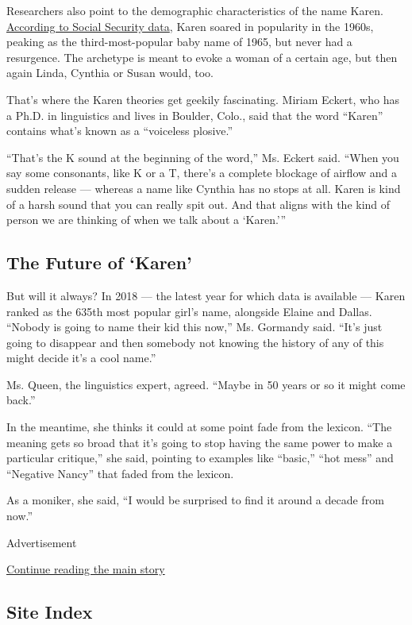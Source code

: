 Researchers also point to the demographic characteristics of the name
Karen. \href{https://www.ssa.gov/OACT/babynames/index.html}{According to
Social Security data}, Karen soared in popularity in the 1960s, peaking
as the third-most-popular baby name of 1965, but never had a resurgence.
The archetype is meant to evoke a woman of a certain age, but then again
Linda, Cynthia or Susan would, too.

That's where the Karen theories get geekily fascinating. Miriam Eckert,
who has a Ph.D. in linguistics and lives in Boulder, Colo., said that
the word ``Karen'' contains what's known as a ``voiceless plosive.''

``That's the K sound at the beginning of the word,'' Ms. Eckert said.
``When you say some consonants, like K or a T, there's a complete
blockage of airflow and a sudden release --- whereas a name like Cynthia
has no stops at all. Karen is kind of a harsh sound that you can really
spit out. And that aligns with the kind of person we are thinking of
when we talk about a `Karen.'''

\hypertarget{the-future-of-karen}{%
\subsection{The Future of `Karen'}\label{the-future-of-karen}}

But will it always? In 2018 --- the latest year for which data is
available --- Karen ranked as the 635th most popular girl's name,
alongside Elaine and Dallas. ``Nobody is going to name their kid this
now,'' Ms. Gormandy said. ``It's just going to disappear and then
somebody not knowing the history of any of this might decide it's a cool
name.''

Ms. Queen, the linguistics expert, agreed. ``Maybe in 50 years or so it
might come back.''

In the meantime, she thinks it could at some point fade from the
lexicon. ``The meaning gets so broad that it's going to stop having the
same power to make a particular critique,'' she said, pointing to
examples like ``basic,'' ``hot mess'' and ``Negative Nancy'' that faded
from the lexicon.

As a moniker, she said, ``I would be surprised to find it around a
decade from now.''

Advertisement

\protect\hyperlink{after-bottom}{Continue reading the main story}

\hypertarget{site-index}{%
\subsection{Site Index}\label{site-index}}

